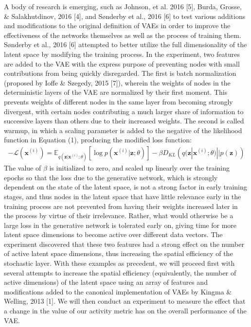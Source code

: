 \documentclass{article} %
\renewcommand{\L}{\mathcal{L}}
\begin{document}
A body of research is emerging, such as Johnson, et al. 2016 [5], Burda, Grosse, \& Salakhutdinov, 2016 [4], and Sønderby et al., 2016 [6] to test various additions and modifications to the original definition of VAEs in order to improve the effectiveness of the networks themselves as well as the process of training them. Sønderby et al., 2016 [6] attempted to better utilize the full dimensionality of the latent space by modifying the training process. In the experiment, two features are added to the VAE with the express purpose of preventing nodes with small contributions from being quickly disregarded. The first is batch normalization (proposed by Ioffe \& Szegedy, 2015 [7]), wherein the weights of nodes in the deterministic layers of the VAE are normalized by their first moment. This prevents weights of different nodes in the same layer from becoming strongly divergent, with certain nodes contributing a much larger share of information to successive layers than others due to their increased weights. The second is called warmup, in which a scaling parameter is added to the negative of the likelihood function in Equation (1), producing the modified loss function:
\begin{align}
  -\L(\textbf{x}^{(i)})=\mathbb{E}_{q(\textbf{z}|\textbf{x}^{(i)};\theta)}\left[\log{p(\textbf{x}^{(i)}|\textbf{z};\theta)}\right]-\beta D_{KL}\left(q(\textbf{z}|\textbf{x}^{(i)};\theta)||p(\textbf{z})\right)
\end{align}
The value of $\beta$ is initialized to zero, and scaled up linearly over the training epochs so that the loss due to the generative network, which is strongly dependent on the state of the latent space, is not a strong factor in early training stages, and thus nodes in the latent space that have little relevance early in the training process are not prevented from having their weights increased later in the process by virtue of their irrelevance. Rather, what would otherwise be a large loss in the generative network is tolerated early on, giving time for more latent space dimensions to become active over different data vectors. The experiment discovered that these two features had a strong effect on the number of active latent space dimensions, thus increasing the spatial efficiency of the stochastic layer.
With these examples as precedent, we will proceed first with several attempts to increase the spatial efficiency (equivalently, the number of active dimensions) of the latent space using an array of features and modifications added to the canonical implementation of VAEs by Kingma \& Welling, 2013 [1]. We will then conduct an experiment to measure the effect that a change in the value of our activity metric has on the overall performance of the VAE.\\
\end{document}
